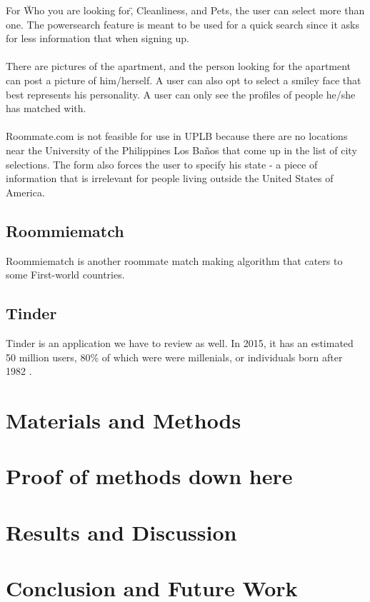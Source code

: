 \documentclass[journal]{./IEEE/IEEEtran}
\newcommand{\UPLB}{University of the Philippines Los Ba\~{n}os }
\begin{document}
For \"Who you are looking for\", Cleanliness, and Pets, the user can select more than one. The powersearch feature is meant to be used for a quick search since it asks for less information that when signing up.
\\
\\
\indent There are pictures of the apartment, and the person looking for the apartment can post a picture of him/herself. A user can also opt to select a smiley face that best represents his personality. A user can only see the profiles of people he/she has matched with.
\\
\\
\indent Roommate.com is not feasible for use in UPLB because there are no locations near the \UPLB that come up in the list of city selections. The form also forces the user to specify his state - a piece of information that is irrelevant for people living outside the United States of America.
\subsection{Roommiematch}
Roommiematch is another roommate match making algorithm that caters to some First-world countries.
\subsection{Tinder}
Tinder is an application we have to review as well. In 2015, it has an estimated 50 million users\cite{tinderstat2}, 80\% of which were were millenials, or individuals born after 1982 \cite{tinderstat}\cite{millenial}.


\section{Materials and Methods}
\section{Proof of methods down here}

\section{Results and Discussion}

\section{Conclusion and Future Work}
\end{document}
